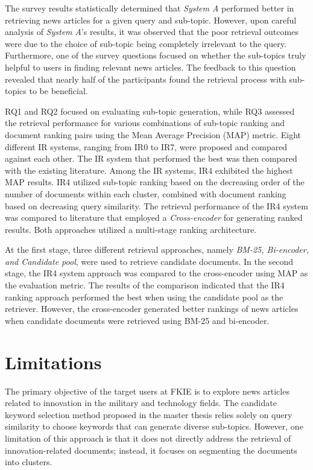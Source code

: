 The survey results statistically determined that \textit{System A} performed better in retrieving news articles for a given query and sub-topic. However, upon careful analysis of \textit{System A}'s results, it was observed that the poor retrieval outcomes were due to the choice of sub-topic being completely irrelevant to the query. Furthermore, one of the survey questions focused on whether the sub-topics truly helpful to users in finding relevant news articles. The feedback to this question revealed that nearly half of the participants found the retrieval process with sub-topics to be beneficial.

RQ1 and RQ2 focused on evaluating sub-topic generation, while RQ3 assessed the retrieval performance for various combinations of sub-topic ranking and document ranking pairs using the Mean Average Precision (MAP) metric. Eight different \ac{IR} systems, ranging from IR0 to IR7, were proposed and compared against each other. The \ac{IR} system that performed the best was then compared with the existing literature. Among the IR systems, IR4 exhibited the highest \ac{MAP} results. IR4 utilized sub-topic ranking based on the decreasing order of the number of documents within each cluster, combined with document ranking based on decreasing query similarity. The retrieval performance of the IR4 system was compared to literature that employed a \textit{Cross-encoder} for generating ranked results. Both approaches utilized a multi-stage ranking architecture.

At the first stage, three different retrieval approaches, namely \textit{BM-25, Bi-encoder, and Candidate pool}, were used to retrieve candidate documents. In the second stage, the IR4 system approach was compared to the cross-encoder using \ac{MAP} as the evaluation metric. The results of the comparison indicated that the IR4 ranking approach performed the best when using the candidate pool as the retriever. However, the cross-encoder generated better rankings of news articles when candidate documents were retrieved using BM-25 and bi-encoder.

\section{Limitations}

The primary objective of the target users at \ac{FKIE} is to explore news articles related to innovation in the military and technology fields. The candidate keyword selection method proposed in the master thesis relies solely on query similarity to choose keywords that can generate diverse sub-topics. However, one limitation of this approach is that it does not directly address the retrieval of innovation-related documents; instead, it focuses on segmenting the documents into clusters.

